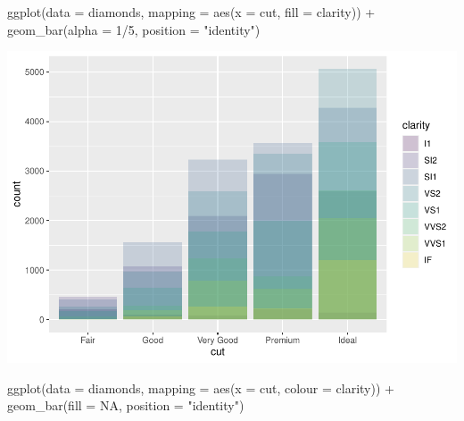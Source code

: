 \documentclass[
]{article}
\newenvironment{Shaded}{\begin{snugshade}}{\end{snugshade}}
\newcommand{\AttributeTok}[1]{\textcolor[rgb]{0.77,0.63,0.00}{#1}}
\newcommand{\ConstantTok}[1]{\textcolor[rgb]{0.00,0.00,0.00}{#1}}
\newcommand{\DecValTok}[1]{\textcolor[rgb]{0.00,0.00,0.81}{#1}}
\newcommand{\FunctionTok}[1]{\textcolor[rgb]{0.00,0.00,0.00}{#1}}
\newcommand{\NormalTok}[1]{#1}
\newcommand{\SpecialCharTok}[1]{\textcolor[rgb]{0.00,0.00,0.00}{#1}}
\newcommand{\StringTok}[1]{\textcolor[rgb]{0.31,0.60,0.02}{#1}}
\begin{document}
\begin{Shaded}
\begin{Highlighting}[]
\FunctionTok{ggplot}\NormalTok{(}\AttributeTok{data =}\NormalTok{ diamonds, }\AttributeTok{mapping =} \FunctionTok{aes}\NormalTok{(}\AttributeTok{x =}\NormalTok{ cut, }\AttributeTok{fill =}\NormalTok{ clarity)) }\SpecialCharTok{+} 
  \FunctionTok{geom\_bar}\NormalTok{(}\AttributeTok{alpha =} \DecValTok{1}\SpecialCharTok{/}\DecValTok{5}\NormalTok{, }\AttributeTok{position =} \StringTok{"identity"}\NormalTok{)}
\end{Highlighting}
\end{Shaded}

\includegraphics{Journal_files/figure-latex/unnamed-chunk-48-4.pdf}

\begin{Shaded}
\begin{Highlighting}[]
\FunctionTok{ggplot}\NormalTok{(}\AttributeTok{data =}\NormalTok{ diamonds, }\AttributeTok{mapping =} \FunctionTok{aes}\NormalTok{(}\AttributeTok{x =}\NormalTok{ cut, }\AttributeTok{colour =}\NormalTok{ clarity)) }\SpecialCharTok{+} 
  \FunctionTok{geom\_bar}\NormalTok{(}\AttributeTok{fill =} \ConstantTok{NA}\NormalTok{, }\AttributeTok{position =} \StringTok{"identity"}\NormalTok{)}
\end{Highlighting}
\end{Shaded}
\end{document}
